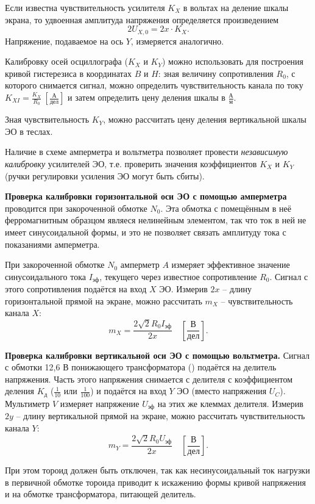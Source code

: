 \documentclass[a4paper, 12pt]{article}
\begin{document}
Если известна чувствительность усилителя $K_X$ в вольтах на деление шкалы экрана, то удвоенная амплитуда напряжения определяется произведением\[2U_{X,0}=2x\cdot K_X.\]Напряжение, подаваемое на ось $Y$, измеряется аналогично.

Калибровку осей осциллографа ($K_X$ и $K_Y$) можно использовать для построения кривой гистерезиса в координатах $B$ и $H$: зная величину сопротивления $R_0$, с которого снимается сигнал, можно определить чувствительность канала по току $K_{XI}=\frac{K_X}{R_0}\ \left[\frac{\text{А}}{\text{дел}}\right]$ и затем определить цену деления шкалы в $\frac{\text{А}}{\text{м}}$.

Зная чувствительность $K_Y$, можно рассчитать цену деления вертикальной шкалы ЭО в теслах.

Наличие в схеме амперметра и вольтметра позволяет провести \textit{независимую калибровку} усилителей ЭО, т.е. проверить значения коэффициентов $K_X$ и $K_Y$ (ручки регулировки усиления ЭО могут быть сбиты).

\textbf{Проверка калибровки горизонтальной оси ЭО с помощью амперметра} проводится при закороченной обмотке $N_0$. Эта обмотка с помещённым в неё ферромагнитным образцом являеся нелинейным элементом, так что ток в ней не имеет синусоидальной формы, и это не позволяет связать амплитуду тока с показаниями амперметра.

При закороченной обмотке $N_0$ амперметр $A$ измеряет эффективное значение синусоидального тока $I_{\text{эф}}$, текущего через известное сопротивление $R_0$. Сигнал с этого сопротивления подаётся на вход $X$ ЭО. Измерив $2x$ -- длину горизонтальной прямой на экране, можно рассчитать $m_X$ -- чувствительность канала $X$:\[m_X=\frac{2\sqrt2R_0I_{\text{эф}}}{2x}\quad\left[\frac{\text{В}}{\text{дел}}\right].\]

\textbf{Проверка калибровки вертикальной оси ЭО с помощью вольтметра.} Сигнал с обмотки 12,6 В понижающего трансформатора () подаётся на делитель напряжения. Часть этого напряжения снимается с делителя с коэффициентом деления $K_{\text{д}}$ ($\frac{1}{10}$ или $\frac{1}{100}$) и подаётся на вход $Y$ ЭО (вместо напряжения $U_C$). Мультиметр $V$ измеряет напряжение $U_{\text{эф}}$ на этих же клеммах делителя. Измерив $2y$ -- длину вертикальной прямой на экране, можно рассчитать чувствительность канала $Y$:\[m_Y=\frac{2\sqrt2R_0U_{\text{эф}}}{2x}\quad\left[\frac{\text{В}}{\text{дел}}\right].\]

При этом тороид должен быть отключен, так как несинусоидальный ток нагрузки в первичной обмотке тороида приводит к искажению формы кривой напряжения и на обмотке трансформатора, питающей делитель.
\end{document}
